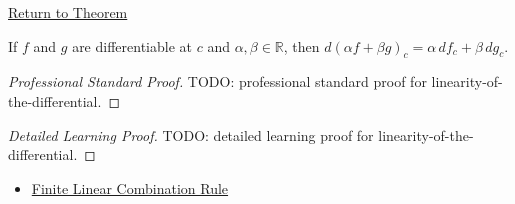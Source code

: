 \newpage
{}
\label{prf:linearity-of-the-differential}

\begin{remark*}[Return]
\hyperref[thm:linearity-of-the-differential]{Return to Theorem}
\end{remark*}

\begin{theorem*}
If $f$ and $g$ are differentiable at $c$ and $\alpha,\beta\in\mathbb{R}$, then $d(\alpha f+\beta g)_c=\alpha\,df_c+\beta\,dg_c$.
\end{theorem*}

\begin{proof}[Professional Standard Proof]
\LRAProofBodyStart
TODO: professional standard proof for linearity-of-the-differential.
\end{proof}

\begin{proof}[Detailed Learning Proof]
\LRAProofBodyStart
TODO: detailed learning proof for linearity-of-the-differential.
\end{proof}

\begin{remark*}
\end{remark*}

\begin{dependencies}
\begin{itemize}
  \item \hyperref[thm:finite-linear-combination-rule]{Finite Linear Combination Rule}
\end{itemize}
\end{dependencies}

\clearpage
